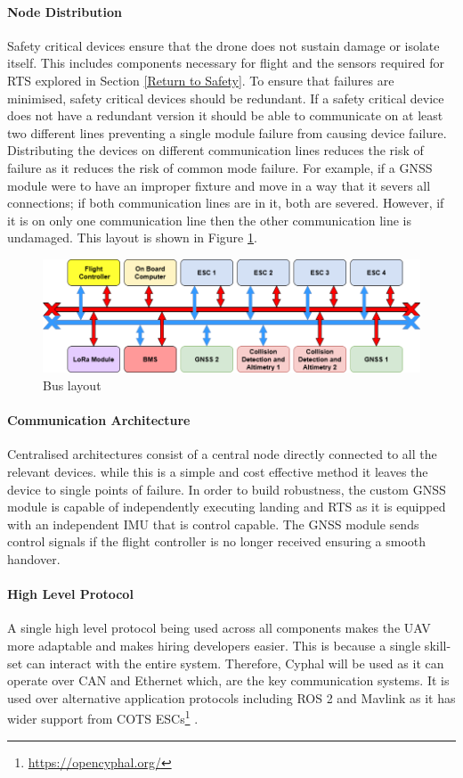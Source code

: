 \paragraph{Node Distribution}
Safety critical devices ensure that the drone does not sustain damage or isolate itself. This includes components necessary for flight and the sensors required for \gls{RTS} explored in Section \ref{Return to Safety}. To ensure that failures are minimised, safety critical devices should be redundant. If a safety critical device does not have a redundant version it should be able to communicate on at least two different lines preventing a single module failure from causing device failure. Distributing the devices on different communication lines reduces the risk of failure as it reduces the risk of common mode failure. For example, if a \gls{GNSS} module were to have an improper fixture and move in a way that it severs all connections; if both communication lines are in it, both are severed. However, if it is on only one communication line then the other communication line is undamaged. This layout is shown in Figure \ref{fig:CAN_bus}. 
 \begin{figure}[h]
 \centering
  \includegraphics[width=1\textwidth]{figs/Thomas/Intra Communication/CAN bus.png}
 \caption{Bus layout}
 \label{fig:CAN_bus}
 \end{figure}
\paragraph{Communication Architecture}
Centralised architectures consist of a central node directly connected to all the relevant devices. while this is a simple and cost effective method it leaves the device to single points of failure. In order to build robustness, the custom \gls{GNSS} module is capable of independently executing landing and \gls{RTS} as it is equipped with an independent \gls{IMU} that is control capable. The \gls{GNSS} module sends control signals if the flight controller is no longer received ensuring a smooth handover. 
\paragraph{High Level Protocol}
A single high level protocol being used across all components makes the \gls{UAV} more adaptable and makes hiring developers easier. This is because a single skill-set can interact with the entire system. Therefore, Cyphal will be used as it can operate over \gls{CAN} and Ethernet which, are the key communication systems. It is used over alternative application protocols including ROS 2 and Mavlink as it has wider support from \gls{COTS} \gls{ESC}s\footnote{\url{https://opencyphal.org/}} . 